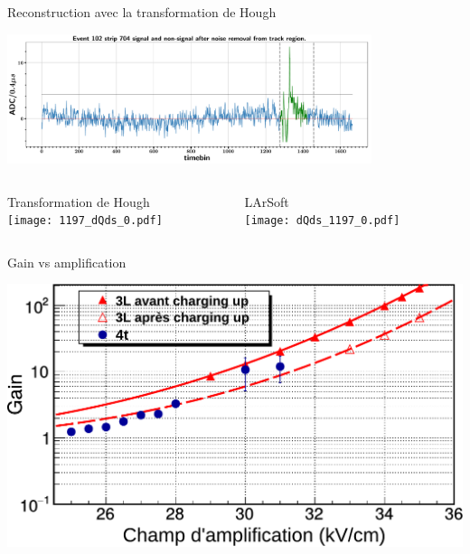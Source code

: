     \begin{frame}{Reconstruction avec la transformation de Hough}
        \begin{scriptsize}
            \begin{center} \includegraphics[width=0.8\textwidth]{./pictures/cnsub_fromtrack.pdf} \end{center}
            \begin{columns}
                \begin{column}{0.6\textwidth}
                    Transformation de Hough\\
                    \texttt{[image: 1197\_dQds\_0.pdf]}
                \end{column}
                \begin{column}{0.4\textwidth}
                    LArSoft\\
                    \texttt{[image: dQds\_1197\_0.pdf]}
                \end{column}
            \end{columns}
        \end{scriptsize}
    \end{frame}
    
    \begin{frame}{Gain vs amplification}
        \begin{scriptsize}
            \centering \includegraphics[width=\textwidth]{./pictures/gain_vs_ampli_full.pdf} \\ 
        \end{scriptsize}
    \end{frame}
    

